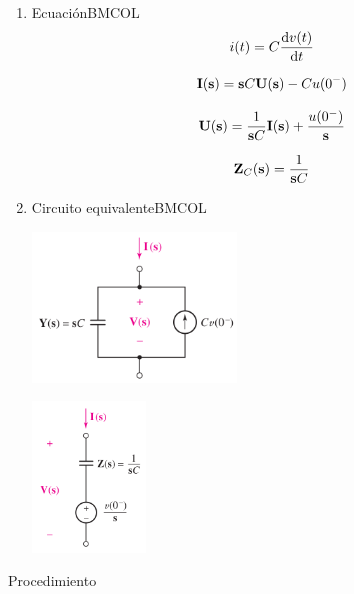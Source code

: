 \begin{enumerate}
\item Ecuación\hfill{}\textsc{BMCOL}
\label{sec:orgdc1a51b}
\[
  i(t) = C \diff{v(t)}{t}
\]

\[
  \mathbf{I}(\mathbf{s}) = \mathbf{s} C \mathbf{U}(\mathbf{s}) - C u(0^-)
\]

\[
  \mathbf{U}(\mathbf{s}) = \frac{1}{\mathbf{s} C} \mathbf{I}(\mathbf{s}) + \frac{u(0^-)}{\mathbf{s}}
\]

\[
  \mathbf{Z}_C(\mathbf{s}) = \frac{1}{\mathbf{s} C}
\]

\item Circuito equivalente\hfill{}\textsc{BMCOL}
\label{sec:org56b9bdd}
\begin{center}
\includegraphics[height=4cm]{../figs/Condensador_Laplace_Admitancia.pdf}
\end{center}


\begin{center}
\includegraphics[height=4cm]{../figs/Condensador_Laplace_Impedancia.pdf}
\end{center}
\end{enumerate}



{Procedimiento}


